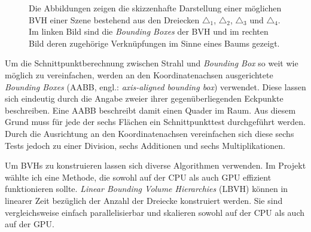 \documentclass[crop=false]{standalone}
\begin{document}
\begin{figure}[h]
\begin{subfigure}[b]{0.49\textwidth}
        \end{subfigure}
        \caption{%
          Die Abbildungen zeigen die skizzenhafte Darstellung einer möglichen BVH einer Szene bestehend aus den Dreiecken $\triangle_1$, $\triangle_2$, $\triangle_3$ und $\triangle_4$.
          Im linken Bild sind die \textit{Bounding Boxes} der BVH und im rechten Bild deren zugehörige Verknüpfungen im Sinne eines Baums gezeigt.
        }
        \label{fig:bvh-scheme}
      \end{figure}

      Um die Schnittpunktberechnung zwischen Strahl und \textit{Bounding Box} so weit wie möglich zu vereinfachen, werden an den Koordinatenachsen ausgerichtete \textit{Bounding Boxes} (AABB, engl.: \textit{axis-aligned bounding box}) verwendet.
      Diese lassen sich eindeutig durch die Angabe zweier ihrer gegenüberliegenden Eckpunkte beschreiben.
      Eine AABB beschreibt damit einen Quader im Raum.
      Aus diesem Grund muss für jede der sechs Flächen ein Schnittpunkttest durchgeführt werden.
      Durch die Ausrichtung an den Koordinatenachsen vereinfachen sich diese sechs Tests jedoch zu einer Division, sechs Additionen und sechs Multiplikationen.

      Um BVHs zu konstruieren lassen sich diverse Algorithmen verwenden.
      Im Projekt wählte ich eine Methode, die sowohl auf der CPU als auch GPU effizient funktionieren sollte.
      \textit{Linear Bounding Volume Hierarchies} (LBVH) können in linearer Zeit bezüglich der Anzahl der Dreiecke konstruiert werden.
      Sie sind vergleichsweise einfach parallelisierbar und skalieren sowohl auf der CPU als auch auf der GPU.
\end{document}
